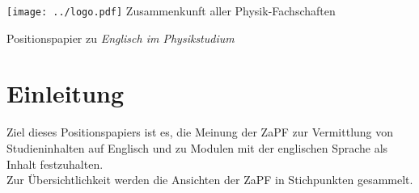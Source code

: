 \documentclass[DIV=calc]{scrartcl}
\begin{document}
\hspace{0.87\textwidth}
\begin{minipage}{120pt}
	\vspace{-1.8cm}
\texttt{[image: ../logo.pdf]}
	\centering
	\small Zusammenkunft aller Physik-Fachschaften
\end{minipage}

\begin{center}
  \huge{Positionspapier zu \textit{Englisch im Physikstudium}}\vspace{.25\baselineskip}\\
  \normalsize
\end{center}
\vspace{1cm}







\section*{Einleitung}
Ziel dieses Positionspapiers ist es, die Meinung der ZaPF zur Vermittlung von Studieninhalten auf Englisch und zu Modulen mit der englischen Sprache als Inhalt festzuhalten.\\
Zur Übersichtlichkeit werden die Ansichten der ZaPF in Stichpunkten gesammelt.
\end{document}
